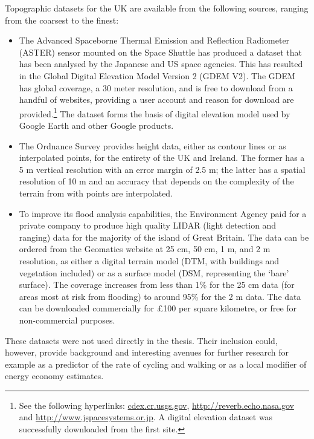 Topographic datasets for the UK are available from the following sources,
ranging from the coarsest to the finest:
\begin{itemize}
\item The Advanced Spaceborne Thermal Emission and Reflection Radiometer
(ASTER) sensor mounted on the Space Shuttle has produced a dataset that has been
analysed by the Japanese and US space agencies. This has resulted in the Global
Digital Elevation Model Version 2 (GDEM V2). The GDEM has global coverage, a 30
meter resolution, and is free to download from a handful of 
websites, providing a user account and reason for download are
provided.\footnote{See the
following hyperlinks: \href{http://gdex.cr.usgs.gov/gdex/}{cdex.cr.usgs.gov},
\href{http://reverb.echo.nasa.gov/reverb/}{http://reverb.echo.nasa.gov} and
\href{http://www.jspacesystems.or.jp/ersdac/GDEM/E/index.html}
{http://www.jspacesystems.or.jp}. A digital elevation dataset was successfully
downloaded from the first site.} The dataset forms the basis of digital
elevation model used by Google Earth and other Google products.
\item The Ordnance Survey provides height data, either as contour lines or as
interpolated points, for the entirety of the UK and Ireland. The former has a 5
m vertical resolution with an error margin of 2.5 m; the latter has a spatial
resolution of 10 m and an accuracy that depends on the complexity of the
terrain from with points are interpolated.
 \item To improve its flood analysis capabilities, the Environment Agency paid
for a private company to produce high quality LIDAR (light detection and
ranging) data for the majority of the island of Great Britain. The data can be
ordered from the Geomatics website at 25 cm, 50 cm, 1 m, and 2 m resolution, as
either a digital terrain model (DTM, with buildings and vegetation included) or
as a surface model (DSM, representing the `bare' surface). The coverage
increases from less than 1\% for the 25 cm data (for areas most at risk from
flooding) to around 95\% for the 2 m data. The data can be downloaded
commercially for \pounds100 per square kilometre, or free for non-commercial purposes.
\end{itemize}
These datasets were not used directly in the thesis.
Their inclusion could, however, provide background and interesting avenues
for further research for example as a predictor of
the rate of cycling and walking or as a local modifier of energy economy estimates.

